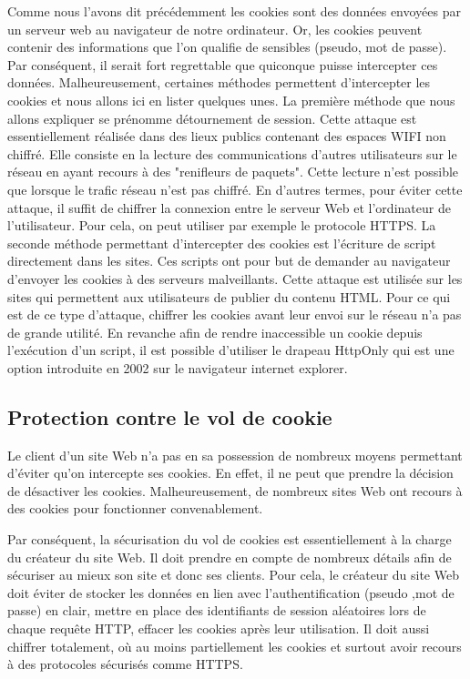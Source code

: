 Comme nous l’avons dit précédemment les cookies sont des données envoyées par un serveur web au navigateur de notre ordinateur. Or, les cookies peuvent contenir des informations que l’on qualifie de sensibles (pseudo, mot de passe). Par conséquent, il serait fort regrettable que quiconque puisse intercepter ces données.
Malheureusement, certaines méthodes permettent d’intercepter les cookies et nous allons ici en lister quelques unes.
La première méthode que nous allons expliquer se prénomme détournement de session. Cette attaque est essentiellement réalisée dans des lieux publics contenant des espaces WIFI non chiffré. Elle consiste en la lecture des communications d’autres utilisateurs sur le réseau en ayant recours à des "renifleurs de paquets". Cette lecture n’est possible que lorsque le trafic réseau n’est pas chiffré. En d’autres termes, pour éviter cette attaque, il suffit de chiffrer la connexion entre le serveur Web et l’ordinateur de l’utilisateur. Pour cela, on peut utiliser par exemple le protocole HTTPS.
La seconde méthode permettant d'intercepter des cookies est l’écriture de script directement dans les sites. Ces scripts ont pour but de demander au navigateur d’envoyer les cookies à des serveurs malveillants. Cette attaque est utilisée sur les sites qui permettent aux utilisateurs de publier du contenu HTML. Pour ce qui est de ce type d’attaque, chiffrer les cookies avant leur envoi sur le réseau n’a pas de grande utilité. En revanche afin de rendre inaccessible un cookie depuis l’exécution d’un script, il est possible d’utiliser le drapeau HttpOnly qui est une option introduite en 2002 sur le navigateur internet explorer.

\subsection{Protection contre le vol de cookie}

Le client d’un site Web n’a pas en sa possession de nombreux moyens permettant d’éviter qu’on intercepte ses cookies. En effet, il ne peut que prendre la décision de désactiver les cookies. Malheureusement, de nombreux sites Web ont recours à des cookies pour fonctionner convenablement.

Par conséquent, la sécurisation du vol de cookies est essentiellement à la charge du créateur du site Web. Il doit prendre en compte de nombreux détails afin de sécuriser au mieux son site et donc ses clients. Pour cela, le créateur du site Web doit éviter de stocker les données en lien avec l’authentification (pseudo ,mot de passe) en clair, mettre en place des identifiants de session aléatoires lors de chaque requête HTTP, effacer les cookies après leur utilisation. Il doit aussi chiffrer totalement, où au moins partiellement les cookies et surtout avoir recours à des protocoles sécurisés comme HTTPS.

